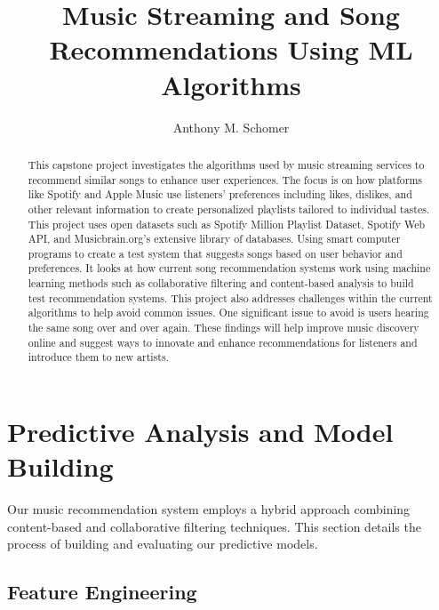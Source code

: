 \documentclass[runningheads]{llncs}
\begin{document}
%
\title{Music Streaming and Song Recommendations Using ML Algorithms}
%
\author{Anthony M. Schomer}
%
%
%
\maketitle              %
%
\begin{abstract}
This capstone project investigates the algorithms used by music streaming services to recommend similar songs to enhance user experiences. The focus is on how platforms like Spotify and Apple Music use listeners' preferences including likes, dislikes, and other relevant information to create personalized playlists tailored to individual tastes. This project uses open datasets such as Spotify Million Playlist Dataset, Spotify Web API, and Musicbrain.org's extensive library of databases. Using smart computer programs to create a test system that suggests songs based on user behavior and preferences. It looks at how current song recommendation systems work using machine learning methods such as collaborative filtering and content-based analysis to build test recommendation systems. This project also addresses challenges within the current algorithms to help avoid common issues. One significant issue to avoid is users hearing the same song over and over again. These findings will help improve music discovery online and suggest ways to innovate and enhance recommendations for listeners and introduce them to new artists.

\end{abstract}

\section{Predictive Analysis and Model Building}

Our music recommendation system employs a hybrid approach combining content-based and collaborative filtering techniques. This section details the process of building and evaluating our predictive models.

\subsection{Feature Engineering}
\end{document}
